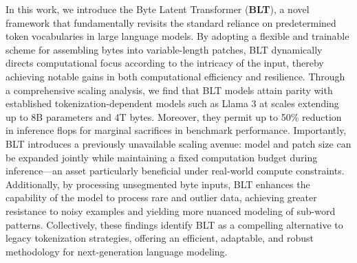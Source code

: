 In this work, we introduce the Byte Latent Transformer (\textbf{BLT}), a novel framework that fundamentally revisits the standard reliance on predetermined token vocabularies in large language models. By adopting a flexible and trainable scheme for assembling bytes into variable-length patches, {\textsc BLT} dynamically directs computational focus according to the intricacy of the input, thereby achieving notable gains in both computational efficiency and resilience. Through a comprehensive scaling analysis, we find that {\textsc BLT} models attain parity with established tokenization-dependent models such as Llama 3 at scales extending up to 8B parameters and 4T bytes. Moreover, they permit up to 50\% reduction in inference flops for marginal sacrifices in benchmark performance. Importantly, {\textsc BLT} introduces a previously unavailable scaling avenue: model and patch size can be expanded jointly while maintaining a fixed computation budget during inference—an asset particularly beneficial under real-world compute constraints. Additionally, by processing unsegmented byte inputs, {\textsc BLT} enhances the capability of the model to process rare and outlier data, achieving greater resistance to noisy examples and yielding more nuanced modeling of sub-word patterns. Collectively, these findings identify {\textsc BLT} as a compelling alternative to legacy tokenization strategies, offering an efficient, adaptable, and robust methodology for next-generation language modeling.

